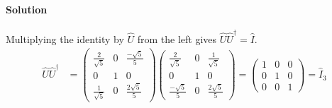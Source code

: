 \documentclass{article}
\begin{document}
\begin{enumerate}
		\paragraph{Solution} Multiplying the identity by $\hat{U}$ from the left gives $\hat{U}\hat{U}^\dagger = \hat{I}$.
		\begin{align*}
			\hat{U}\hat{U}^\dagger &=
			\begin{pmatrix}
				\frac{2}{\sqrt{5}} & 0 & \frac{-\sqrt{5}}{5} \\
				0 & 1 & 0 \\
				\frac{1}{\sqrt{5}} & 0 & \frac{2\sqrt{5}}{5}
			\end{pmatrix}
			\begin{pmatrix}
				\frac{2}{\sqrt{5}} & 0 & \frac{1}{\sqrt{5}} \\
				0 & 1 & 0 \\
				\frac{-\sqrt{5}}{5} & 0 & \frac{2\sqrt{5}}{5}
			\end{pmatrix}
			=
			\begin{pmatrix}
				1 & 0 & 0 \\
				0 & 1 & 0 \\
				0 & 0 & 1
			\end{pmatrix}
			= \hat{I}_3
		\end{align*}
		
	\end{enumerate}
	
\clearpage	
	
\end{document}
